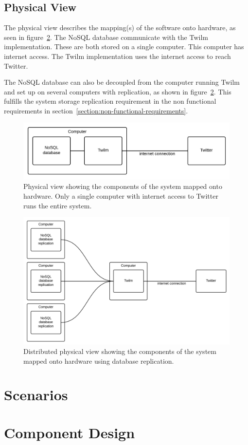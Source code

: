 \subsection{Physical View}
The physical view describes the mapping(s) of the software onto hardware, as seen in figure~\ref{figure:development-view}. The NoSQL database communicate with the Twilm implementation. These are both stored on a single computer. This computer has internet access. The Twilm implementation uses the internet access to reach Twitter.

The NoSQL database can also be decoupled from the computer running Twilm and set up on several computers with replication, as shown in figure~\ref{figure:development-view}. This fulfills the system storage replication requirement in the non functional requirements in section~\ref{section:non-functional-requirements}.

\begin{figure}[H]
\centerline{\includegraphics[width=4.5in]{image/architecture-physical-view.png}}
\caption{Physical view showing the components of the system mapped onto hardware. Only a single computer with internet access to Twitter runs the entire system.}
\label{figure:development-view}
\end{figure}

\begin{figure}[H]
\centerline{\includegraphics[width=4.5in]{image/architecture-physical-view-distributed.png}}
\caption{Distributed physical view showing the components of the system mapped onto hardware using database replication.}
\label{figure:development-view}
\end{figure}


\section{Scenarios}

\section{Component Design}


